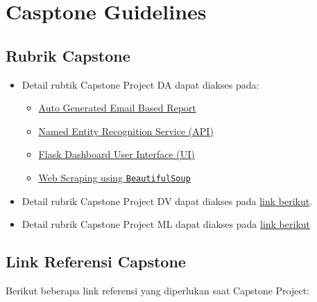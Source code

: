 \documentclass[
]{book}
\providecommand{\tightlist}{%
  \setlength{\itemsep}{0pt}\setlength{\parskip}{0pt}}
\begin{document}
\hypertarget{casptone-guidelines}{%
\section{Casptone Guidelines}\label{casptone-guidelines}}

\hypertarget{rubrik-capstone}{%
\subsection{Rubrik Capstone}\label{rubrik-capstone}}

\begin{itemize}
\item
  Detail rubtik Capstone Project DA dapat diakses pada:

  \begin{itemize}
  \tightlist
  \item
    \href{https://github.com/ttnsy/fire-capstone}{Auto Generated Email Based Report}
  \item
    \href{https://github.com/iqbalbasyar/ner-flask}{Named Entity Recognition Service (API)}
  \item
    \href{https://github.com/fafilia/capstone-UIFlask}{Flask Dashboard User Interface (UI)}
  \item
    \href{https://github.com/t3981-h/BeautifulSoup-Capstone}{Web Scraping using \texttt{BeautifulSoup}}
  \end{itemize}
\item
  Detail rubrik Capstone Project DV dapat diakses pada \href{https://rpubs.com/AlgoritmaAcademy/dv-capstone}{link berikut}.
\item
  Detail rubrik Capstone Project ML dapat diakses pada \href{https://rpubs.com/AlgoritmaAcademy/ml-capstone}{link berikut}
\end{itemize}

\hypertarget{link-referensi-capstone}{%
\subsection{Link Referensi Capstone}\label{link-referensi-capstone}}

Berikut beberapa link referensi yang diperlukan saat Capstone Project:
\end{document}
